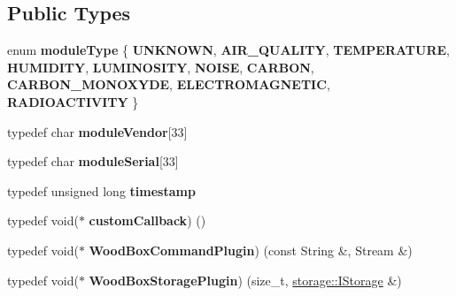 \subsection*{Public Types}
\begin{DoxyCompactItemize}
\item 
\mbox{\label{classwood_box_1_1module_1_1_wood_box_module_af74476c8a785de7fe587c4fb68435673}} 
enum {\bfseries module\+Type} \{ \newline
{\bfseries U\+N\+K\+N\+O\+WN}, 
{\bfseries A\+I\+R\+\_\+\+Q\+U\+A\+L\+I\+TY}, 
{\bfseries T\+E\+M\+P\+E\+R\+A\+T\+U\+RE}, 
{\bfseries H\+U\+M\+I\+D\+I\+TY}, 
\newline
{\bfseries L\+U\+M\+I\+N\+O\+S\+I\+TY}, 
{\bfseries N\+O\+I\+SE}, 
{\bfseries C\+A\+R\+B\+ON}, 
{\bfseries C\+A\+R\+B\+O\+N\+\_\+\+M\+O\+N\+O\+X\+Y\+DE}, 
\newline
{\bfseries E\+L\+E\+C\+T\+R\+O\+M\+A\+G\+N\+E\+T\+IC}, 
{\bfseries R\+A\+D\+I\+O\+A\+C\+T\+I\+V\+I\+TY}
 \}
\item 
\mbox{\label{classwood_box_1_1module_1_1_wood_box_module_adf5d59bae2980ff138284d0fa885df19}} 
typedef char {\bfseries module\+Vendor}\mbox{[}33\mbox{]}
\item 
\mbox{\label{classwood_box_1_1module_1_1_wood_box_module_a3a6503bbd5147a06ba50081f97177b46}} 
typedef char {\bfseries module\+Serial}\mbox{[}33\mbox{]}
\item 
\mbox{\label{classwood_box_1_1module_1_1_wood_box_module_ab03bf835ec02656605c3c0df0188dc28}} 
typedef unsigned long {\bfseries timestamp}
\item 
\mbox{\label{classwood_box_1_1module_1_1_wood_box_module_ab6d400f05cc572fb9fd28dd0baf6d346}} 
typedef void($\ast$ {\bfseries custom\+Callback}) ()
\item 
\mbox{\label{classwood_box_1_1module_1_1_wood_box_module_ab0e08bb82f5585fd357ce1881855d0e2}} 
typedef void($\ast$ {\bfseries Wood\+Box\+Command\+Plugin}) (const String \&, Stream \&)
\item 
\mbox{\label{classwood_box_1_1module_1_1_wood_box_module_ac7fea0a06e9fcab2ffb63500f6cd6565}} 
typedef void($\ast$ {\bfseries Wood\+Box\+Storage\+Plugin}) (size\+\_\+t, \mbox{\hyperlink{classwood_box_1_1storage_1_1_i_storage}{storage\+::\+I\+Storage}} \&)
\end{DoxyCompactItemize}
